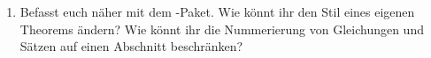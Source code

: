 \begin{uebung}
\begin{enumerate}[label=(\alph*)]
                  \begin{proof}\text{ }\\
                  \begin{enumerate}[label=(\roman*)]
                      \item Ausnutzung der Eigenschaft des neutralen Elements liefert $e_1 = e_1\circ e_2=e_2$.
                      \item Es gilt: 
                          \begin{alignat*}{2}
                              h_2 &= e\circ h_2 = (h_1\circ g)\circ h_2\\
                                  &= h_1 \circ (g\circ h_2)\\
                                  &= h_1 \circ e = h_1
                          \end{alignat*}  
                  \end{enumerate}
                  \end{proof}
                  \begin{hinweis}
                      Schaut euch das -Paket an.
                  \end{hinweis}
          \item 
              Befasst euch näher mit dem -Paket. Wie könnt ihr den Stil eines eigenen Theorems ändern? Wie könnt ihr die Nummerierung von Gleichungen und Sätzen auf einen Abschnitt beschränken? 
              

\end{enumerate}
\end{uebung}
